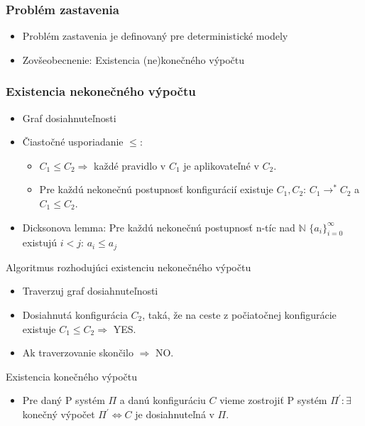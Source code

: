 \begin{frame}[t]\frametitle{Problém zastavenia}
  \begin{itemize}
    \item Problém zastavenia je definovaný pre deterministické modely
    \pause
    \item Zovšeobecnenie: Existencia (ne)konečného výpočtu
  \end{itemize}

\end{frame}
\note{}

\begin{frame}[t]\frametitle{Existencia nekonečného výpočtu}
  \begin{itemize}
    \item Graf dosiahnuteľnosti
    \pause
    \item Čiastočné usporiadanie $\leq$:
    \begin{itemize}
      \item $C_1 \leq C_2 \Rightarrow$ každé pravidlo v $C_1$ je aplikovateľné v $C_2$.
      \pause
      \item Pre každú nekonečnú postupnosť konfigurácií existuje $C_1, C_2$: $C_1 \rightarrow^* C_2$ a $C_1 \leq C_2$.
    \end{itemize}
    \pause
    \item Dicksonova lemma: Pre každú nekonečnú postupnosť n-tíc nad $\mathbb{N}$ $\{a_i\}_{i=0}^\infty$ existujú $i<j$: $a_i\leq a_j$
  \end{itemize}
\end{frame}

\begin{frame}[t]{Algoritmus rozhodujúci existenciu nekonečného výpočtu}
  \begin{itemize}
    \item Traverzuj graf dosiahnuteľnosti
    \item Dosiahnutá konfigurácia $C_2$, taká, že na ceste z počiatočnej konfigurácie existuje $C_1\leq C_2\Rightarrow$ YES.
    \item Ak traverzovanie skončilo $\Rightarrow$ NO.
  \end{itemize}
\end{frame}

\begin{frame}[t]{Existencia konečného výpočtu}
  \begin{itemize}
    \item Pre daný P systém $\Pi$ a danú konfiguráciu $C$ vieme zostrojiť P systém $\Pi^\prime: \exists$ konečný výpočet $\Pi^\prime\Leftrightarrow C$ je dosiahnuteľná v $\Pi$.  
  \end{itemize}  
\end{frame}

